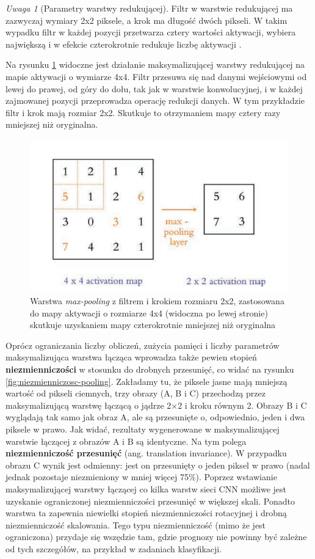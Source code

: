 \documentclass[12pt]{mwbk}
\theoremstyle{plain}
\theoremstyle{definition}
\theoremstyle{remark}
\newtheorem{uwaga}{Uwaga}[chapter]
\newcommand\zrodlo[1]{\par\vspace{-3mm}{\small\textit{Źródło: }#1 }}
\begin{document}
\begin{uwaga}[Parametry warstwy redukującej]
	 Filtr w warstwie redukującej ma zazwyczaj wymiary 2x2 piksele, a krok ma długość dwóch pikseli. W takim wypadku filtr w każdej pozycji przetwarza cztery wartości aktywacji, wybiera największą i w efekcie czterokrotnie redukuje liczbę aktywacji \cite{illustrated}.
\end{uwaga}



Na rysunku \ref{fig:max-polling} widoczne jest działanie maksymalizującej warstwy redukującej na mapie aktywacji o wymiarze 4x4. Filtr przesuwa się nad danymi wejściowymi od lewej do prawej, od góry do dołu, tak jak w warstwie konwolucyjnej, i w każdej zajmowanej pozycji przeprowadza operację redukcji danych. W tym przykładzie filtr i krok mają rozmiar 2x2. Skutkuje to otrzymaniem mapy cztery razy mniejszej niż oryginalna.

\begin{figure}[!h]
	\centering
	\includegraphics[width=0.7\linewidth]{rys/max-polling.png}
	\caption{Warstwa \emph{max-pooling} z filtrem i krokiem rozmiaru 2x2, zastosowana do mapy aktywacji o rozmiarze 4x4 (widoczna po lewej stronie) skutkuje uzyskaniem mapy czterokrotnie mniejszej niż oryginalna}
	\zrodlo{\cite{illustrated}}
	\label{fig:max-polling}
\end{figure}

Oprócz ograniczania liczby obliczeń, zużycia pamięci i liczby parametrów maksymalizująca warstwa łącząca wprowadza także pewien stopień \textbf{niezmienniczości} w stosunku do drobnych przesunięć, co widać na rysunku \ref{fig:niezmienniczosc-pooling}. Zakładamy tu, że piksele jasne mają mniejszą wartość od pikseli
ciemnych, trzy obrazy (A, B i C) przechodzą przez maksymalizującą warstwę łączącą o jądrze 2×2
i kroku równym 2. Obrazy B i C wyglądają tak samo jak obraz A, ale są przesunięte o, odpowiednio, jeden i dwa piksele w prawo. Jak widać, rezultaty wygenerowane w maksymalizującej warstwie łączącej z obrazów A i B są identyczne. Na tym polega \textbf{niezmienniczość przesunięć} (ang. translation invariance). W przypadku obrazu C wynik jest odmienny: jest on przesunięty o jeden piksel w prawo (nadal jednak pozostaje niezmieniony w mniej więcej 75\%). Poprzez wstawianie maksymalizującej warstwy łączącej co kilka warstw sieci CNN możliwe jest uzyskanie ograniczonej niezmienniczości przesunięć w większej skali. Ponadto warstwa ta zapewnia niewielki stopień niezmienniczości rotacyjnej i drobną niezmienniczość skalowania. Tego typu niezmienniczość (mimo że jest ograniczona) przydaje się wszędzie tam, gdzie prognozy nie powinny być zależne od tych szczegółów, na przykład w zadaniach klasyfikacji.
\end{document}
